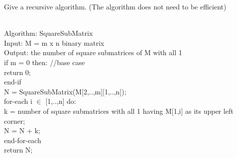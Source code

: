 \documentclass[solutionorbox,answers]{exam}
\begin{document}
\begin{questions}
\begin{parts}
  \item Give a recursive algorithm. (The algorithm does not need to be efficient)
  \begin{solutionbox}{}\vspace{1em}\\
    Algorithm: SquareSubMatrix\\
    Input: M = m x n binary matrix\\
    Output: the number of square submatrices of M with all 1\\
    if m = 0 then: //base case \\
        return 0;\\
    end-if\\
    N = SquareSubMatrix(M[2,..,m][1,..,n]);\\
    for-each i $\in$ [1,..,n] do:\\
        k = number of square submatrices with all 1 having M[1,i] as its upper left corner;\\
        N = N + k;\\
    end-for-each\\
    return N;\\
  \end{solutionbox}
  

\end{parts}
\end{questions}
\end{document}
